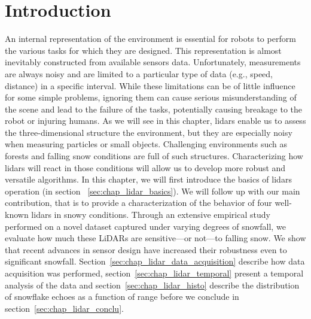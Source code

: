 \section{Introduction}
\label{sec:chap_lidar_intro}

An internal representation of the environment is essential for robots to perform the various tasks for which they are designed. This representation is almost inevitably constructed from available sensors data. Unfortunately, measurements are always noisy and are limited to a particular type of data (e.g., speed, distance) in a specific interval. While these limitations can be of little influence for some simple problems, ignoring them can cause serious misunderstanding of the scene and lead to the failure of the tasks, potentially causing breakage to the robot or injuring humans. As we will see in this chapter, \gls*{lidar}s enable us to assess the three-dimensional structure the environment, but they are especially noisy when measuring particles or small objects. Challenging environments such as forests and falling snow conditions are full of such structures. Characterizing how \gls*{lidar}s will react in those conditions will allow us to develop more robust and versatile algorithms. In this chapter, we will first introduce the basics of \gls*{lidar}s operation (in section ~\ref{sec:chap_lidar_basics}). We will follow up with our main contribution, that is to provide a characterization of the behavior of four well-known \gls*{lidar}s in snowy conditions. Through an extensive empirical study performed on a novel dataset captured under varying degrees of snowfall, we evaluate how much these LiDARs are sensitive---or not---to falling snow. We show that recent advances in sensor design have increased their robustness even to significant snowfall. Section~\ref{sec:chap_lidar_data_acquisition} describe how data acquisition was performed, section~\ref{sec:chap_lidar_temporal} present a temporal analysis of the data and section~\ref{sec:chap_lidar_histo} describe the distribution of snowflake echoes as a function of range before we conclude in section~\ref{sec:chap_lidar_conclu}. 

